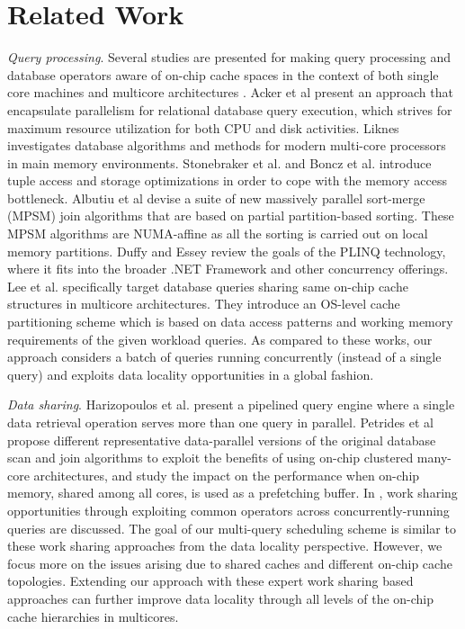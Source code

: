 \section{Related Work}\label{sec:related}


{\em Query processing}.  Several studies are presented for making query processing and database operators aware of on-chip cache spaces in the context of both single core machines \cite{Shatdal:1994} and multicore architectures \cite{Cieslewicz:2007,Cieslewicz:2009,Yadan:2009}.  Acker et al \cite{Acker:2008}  present an approach that encapsulate parallelism for relational database query execution, which  strives for maximum resource utilization for both CPU and disk activities.  Liknes \cite{Stian} investigates  database algorithms and methods for modern multi-core processors in main memory environments. Stonebraker et al. \cite{Stonebraker:2005} and Boncz et al. \cite{Boncz:2008} introduce tuple access and storage optimizations in order to cope with the memory access bottleneck.  Albutiu et al \cite{Albutiu:2012} devise a suite of new massively parallel sort-merge (MPSM) join algorithms that are based on partial partition-based sorting.  These MPSM algorithms are NUMA-affine as all the sorting is carried out on local memory partitions.    Duffy and Essey \cite{Joe}  review the goals of the PLINQ technology, where it fits into the broader .NET Framework and other concurrency offerings.  Lee et al. \cite{Lee:2009} specifically target database queries sharing same on-chip cache structures in multicore architectures. They introduce an OS-level cache partitioning scheme which is based on data access patterns and working memory requirements of the given workload queries. 
 As compared to these works, our approach considers a batch of queries running concurrently (instead of a single query) and exploits data locality opportunities in a global fashion. 
 
{\em Data sharing}. Harizopoulos et al. \cite{Harizopoulos:2005} present a pipelined query engine where a single data retrieval operation serves more than one query in parallel.  Petrides et al \cite{Petrides:2013SED}  propose different representative data-parallel versions of the original database scan and join algorithms to exploit the benefits of using on-chip clustered many-core architectures, and study the impact on the performance when on-chip memory, shared among all cores, is used as a prefetching buffer.  In \cite{Ross:2010,Qiao:2008,Zukowski:2007}, work sharing opportunities through exploiting common operators across concurrently-running queries are discussed. The goal of our multi-query scheduling scheme is similar to these work sharing approaches from the data locality perspective. However, we focus more on the issues arising due to shared caches and different on-chip cache topologies. Extending our approach with these expert work sharing based approaches can further improve data locality through all levels of the on-chip cache hierarchies in multicores.  

